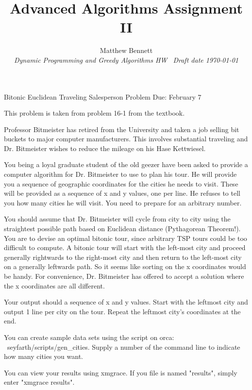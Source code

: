 \documentclass[10pt,fullpage]{article}
\title{ Advanced Algorithms Assignment II }
\author{Matthew Bennett \\
{\small\em Dynamic Programming and Greedy Algorithms HW \  Draft
date \today }}
\date{ }
\begin{document}
\maketitle

Bitonic Euclidean Traveling Salesperson Problem Due: February 7

This problem is taken from problem 16-1 from the textbook.

Professor Bitmeister has retired from the University and taken a
job selling bit buckets to major computer manufacturers. This
involves substantial traveling and Dr. Bitmeister wishes to reduce
the mileage on his Hase Kettwiesel.

You being a loyal graduate student of the old geezer have been
asked to provide a computer algorithm for Dr. Bitmeister to use to
plan his tour. He will provide you a sequence of geographic
coordinates for the cities he needs to visit. These will be
provided as a sequence of x and y values, one per line. He refuses
to tell you how many cities he will visit. You need to prepare for
an arbitrary number.

You should assume that Dr. Bitmeister will cycle from city to city
using the straightest possible path based on Euclidean distance
(Pythagorean Theorem!). You are to devise an optimal bitonic tour,
since arbitrary TSP tours could be too difficult to compute. A
bitonic tour will start with the left-most city and proceed
generally rightwards to the right-most city and then return to the
left-most city on a generally leftwards path. So it seems like
sorting on the x coordinates would be handy. For convenience, Dr.
Bitmeister has offered to accept a solution where the x
coordinates are all different.

Your output should a sequence of x and y values. Start with the
leftmost city and output 1 line per city on the tour. Repeat the
leftmost city's coordinates at the end.

You can create sample data sets using the script on orca:
~seyfarth/scripts/gen_cities. Supply a number of the command line
to indicate how many cities you want.

You can view your results using xmgrace. If you file is named
"results", simply enter "xmgrace results".
\end{document}
